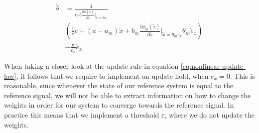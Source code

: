 \begin{equation}
    \begin{aligned}
     \dot \theta & = \frac{1}{e_x b \frac{\partial \phi(\tilde x)}{\partial \tilde x}\vert_{\tilde x=\theta e_x}}\\ 
     & (  \frac{1}{c} e + (a-a_m)\dot x + b_m\frac{\partial \phi_m(\tilde x)}{\partial \tilde x}\vert_{\tilde x=\theta_me_x}\theta_m \dot e_x) \\ 
    & - \frac{\theta}{e_x}\dot e_x
    \end{aligned}
    \label{eq:nonlinear-update-law}
\end{equation}

When taking a closer look at the update rule in equation \eqref{eq:nonlinear-update-law}, it follows that we require to implement an update hold, when $e_x=0$. This is reasonable, since whenever the state of our reference system is equal to the reference signal, we will not be able to extract information on how to change the weights in order for our system to converge towards the reference signal. In practice this means that we implement a threshold $\varepsilon$, where we do not update the weights.